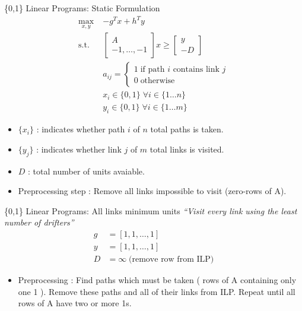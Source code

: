 \documentclass{beamer}
\begin{document}
\begin{frame}{\{0,1\} Linear Programs: Static Formulation}
\begin{align*}
\max_{x,y}\;& -g^Tx + h^Ty \\
\mbox{s.t.}\;& \left[ \begin{array}{c}
                       A\\
                       -1, \dots, -1
                      \end{array}\right] x \geq \left[ \begin{array}{c} y\\-D \end{array}\right] \\
&a_{ij} = \begin{cases}
           1\;\mbox{if path $i$ contains link $j$}\\
           0\;\mbox{otherwise}
          \end{cases}\\
&x_i \in \{0,1\}\;\forall i\in\{1\dots n\}\\
&y_i \in \{0,1\}\;\forall i\in\{1\dots m\}
\end{align*}

\begin{itemize}
\item $\{x_i\}$ : indicates whether path $i$ of $n$ total paths is taken.
\item $\{y_j\}$ : indicates whether link $j$ of $m$ total links is visited.
\item $D$ : total number of units avaiable.
\item Preprocessing step : Remove all links impossible to visit (zero-rows of A).
\end{itemize}

\end{frame}


\begin{frame}{\{0,1\} Linear Programs: All links minimum units}
\emph{``Visit every link using the least number of drifters''}
\begin{align*}
g &= \left[ 1,1, \dots ,1\right]\\
y &= \left[ 1,1, \dots ,1\right]\\
D &= \infty \;\mbox{(remove row from ILP)}
\end{align*}

\begin{itemize}
 \item Preprocessing : Find paths which must be taken ( rows of A containing only one 1 ). Remove these paths and all of their links from ILP. Repeat until all rows of A have two or more 1s.
\end{itemize}
\end{frame}
\end{document}
